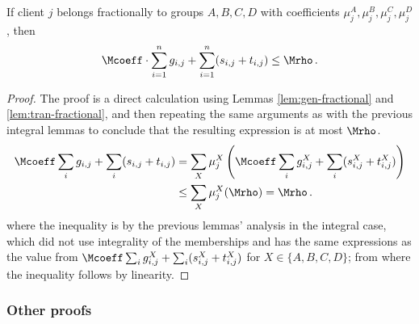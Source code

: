 \begin{lemma}
    \label{lem:budget-fractional}
    If client $j$ belongs fractionally to groups $A,B,C,D$ with coefficients $\mu_j^A, \mu_j^B, \mu_j^C, \mu_j^D$, then
    \begin{equation*}
        \Mcoeff \cdot \sum_{i=1}^n g_{i,j} + \sum_{i=1}^n (s_{i,j} + t_{i,j}) \leq \Mrho\,.
    \end{equation*}
\end{lemma}
\begin{proof}
    The proof is a direct calculation using Lemmas \ref{lem:gen-fractional} and \ref{lem:tran-fractional}, and then repeating the same arguments as with the previous integral lemmas to conclude that the resulting expression is at most $\Mrho$.
    \begin{align*}
        \Mcoeff \sum_i g_{i,j} + \sum_i(s_{i,j}+t_{i,j})
        &= \sum_X \mu_j^X \left(\Mcoeff \sum_i g_{i,j}^X + \sum_i(s_{i,j}^X+t_{i,j}^X)\right) \\
        &\le \sum_X \mu_j^X (\Mrho)
        = \Mrho\,.
    \end{align*}
    where the inequality is by the previous lemmas' analysis in the integral case, which did not use integrality of the memberships and has the same expressions as the value from $\Mcoeff \sum_i g_{i,j}^X + \sum_i(s_{i,j}^X+t_{i,j}^X)$ for $X \in \{A,B,C,D\}$; from where the inequality follows by linearity.
\end{proof}

\subsubsection{Other proofs}

